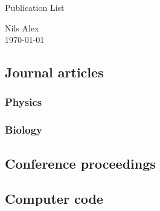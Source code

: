 \documentclass[%
english,
12pt,
twoside=false,
headsepline,
numbers=noenddot,
parskip=half,
a4paper,
final
]{scrarticle}
\begin{document}
\enlargethispage{\baselineskip}

\begin{center}
  \large Publication List

  \normalsize Nils Alex \\ \today
\end{center}

\subsection*{Journal articles}
\subsubsection*{Physics}



\subsubsection*{Biology}


\subsection*{Conference proceedings}



\subsection*{Computer code}



\end{document}
